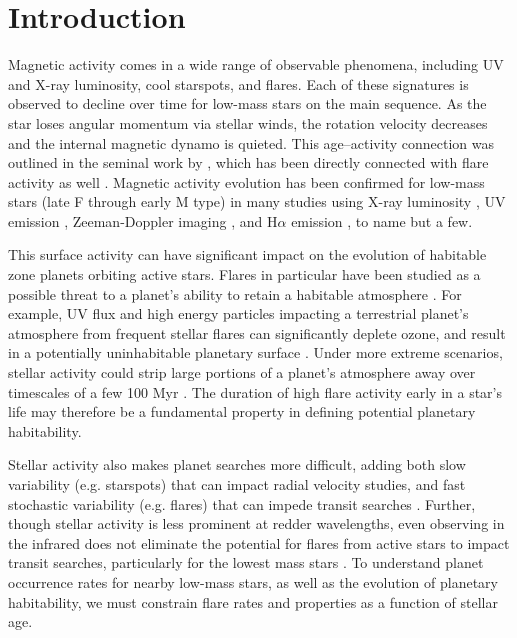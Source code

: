 \documentclass[preprint2]{aastex62}
\begin{document}
\section{Introduction}

Magnetic activity comes in a wide range of observable phenomena, including UV and X-ray luminosity, cool starspots, and flares. Each of these signatures is observed to decline over time for low-mass stars on the main sequence. 
As the star loses angular momentum via stellar winds, the rotation velocity decreases and the internal magnetic dynamo is quieted. This age--activity connection was outlined in the seminal work by \citet{skumanich1972}, which has been directly connected with flare activity as well \citep{skumanich1986}. Magnetic activity evolution has been confirmed for low-mass stars (late F through early M type) in many studies using X-ray luminosity \citep{wright2011,nunez2017}, UV emission \citep{shkolnik2014}, Zeeman-Doppler imaging \citep{vidotto2014}, and H$\alpha$ emission \citep{west2015}, to name but a few. 


This surface activity can have significant impact on the evolution of habitable zone planets orbiting active stars. Flares in particular have been studied as a possible threat to a planet's ability to retain a habitable atmosphere \citep[e.g.][]{segura2010,luger2015,tilley2017}. For example, UV flux and high energy particles impacting a terrestrial planet's atmosphere from frequent stellar flares can significantly deplete ozone, and result in a potentially uninhabitable planetary surface \citep{tilley2017}. Under more extreme scenarios, stellar activity could strip large portions of a planet's atmosphere away over timescales of a few 100 Myr \citep{luger2015}. The duration of high flare activity early in a star's life may therefore be a fundamental property in defining potential planetary habitability. 


Stellar activity also makes planet searches more difficult, adding both slow variability (e.g. starspots) that can impact radial velocity studies, and fast stochastic variability (e.g. flares) that can impede transit searches \citep[e.g.][]{kipping2017}. Further, though stellar activity is less prominent at redder wavelengths, even observing in the infrared does not eliminate the potential for flares from active stars to impact transit searches, particularly for the lowest mass stars \citep{davenport2017a}. To understand planet occurrence rates for nearby low-mass stars, as well as the evolution of planetary habitability, we must constrain flare rates and properties as a function of stellar age.
\end{document}
